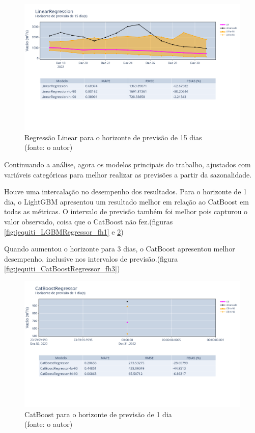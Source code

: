 \begin{figure}[!h]
	\centering
	\includegraphics[scale=0.33]{Figuras/jequiti/resultados/LinearRegression_fh15.png}
	\caption{Regressão Linear para o horizonte de previsão de 15 dias\\(fonte: o autor)}
	\label{fig:jequiti_LinearRegression_fh15}
\end{figure}

Continuando a análise, agora os modelos principais do trabalho, ajustados com variáveis categóricas para melhor realizar as previsões a partir da sazonalidade.

Houve uma intercalação no desempenho dos resultados. Para o horizonte de 1 dia, o LightGBM apresentou um resultado melhor em relação ao CatBoost em todas as métricas. O intervalo de previsão também foi melhor pois capturou o valor observado, coisa que o CatBoost não fez.(figuras \ref{fig:jequiti_LGBMRegressor_fh1} e \ref{fig:jequiti_CatBoostRegressor_fh1})

Quando aumentou o horizonte para 3 dias, o CatBoost apresentou melhor desempenho, inclusive nos intervalos de previsão.(figura \ref{fig:jequiti_CatBoostRegressor_fh3})

\begin{figure}[!h]
	\centering
	\includegraphics[scale=0.33]{Figuras/jequiti/resultados/CatBoostRegressor_fh1.png}
	\caption{CatBoost para o horizonte de previsão de 1 dia\\(fonte: o autor)}
	\label{fig:jequiti_CatBoostRegressor_fh1}
\end{figure}

